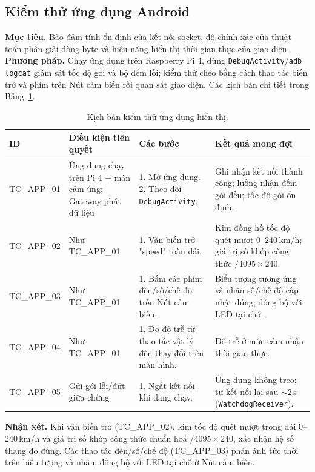 \documentclass[../DoAn.tex]{subfiles}
\begin{document}
\subsection{Kiểm thử ứng dụng Android}
\label{section:4.4.3}

\textbf{Mục tiêu.} Bảo đảm tính ổn định của kết nối socket, độ chính xác của
thuật toán phân giải dòng byte và hiệu năng hiển thị thời gian thực của giao
diện. \textbf{Phương pháp.} Chạy ứng dụng trên Raspberry Pi 4, dùng
\texttt{DebugActivity}/\texttt{adb logcat} giám sát tốc độ gói và bộ đếm lỗi;
kiểm thử chéo bằng cách thao tác biến trở và phím trên Nút cảm biến rồi quan sát
giao diện. Các kịch bản chi tiết trong Bảng~\ref{tab:tc-app}.

\begin{table}[H]
  \centering
  \caption{Kịch bản kiểm thử ứng dụng hiển thị.}
  \label{tab:tc-app}
  \begin{tabular}{@{}p{1.7cm}p{2.6cm}p{4.2cm}p{4.2cm}@{}}
    \toprule
    \textbf{ID} & \textbf{Điều kiện tiên quyết} & \textbf{Các bước} & \textbf{Kết quả mong đợi} \\
    \midrule
    TC\_APP\_01 & Ứng dụng chạy trên Pi 4 + màn cảm ứng; Gateway phát dữ liệu &
      1. Mở ứng dụng. 2. Theo dõi \texttt{DebugActivity}. & Ghi nhận kết nối
      thành công; luồng nhận đếm gói đều; tốc độ gói ổn định. %
      \\
    TC\_APP\_02 & Như TC\_APP\_01 & 1. Vặn biến trở "speed" toàn dải. & Kim đồng
      hồ tốc độ quét mượt 0--240\,km/h; giá trị số khớp công thức $/4095\times240$. \\
    TC\_APP\_03 & Như TC\_APP\_01 & 1. Bấm các phím đèn/số/chế độ trên Nút cảm
      biến. & Biểu tượng tương ứng và nhãn số/chế độ cập nhật đúng; đồng bộ với
      LED tại chỗ. \\
    TC\_APP\_04 & Như TC\_APP\_01 & 1. Đo độ trễ từ thao tác vật lý đến thay đổi
      trên màn hình. & Độ trễ ở mức cảm nhận thời gian thực. %
      \\
    TC\_APP\_05 & Gửi gói lỗi/đứt giữa chừng & 1. Ngắt kết nối khi đang chạy. &
      Ứng dụng không treo; tự kết nối lại sau $\sim$2\,s (\texttt{WatchdogReceiver}). \\
    \bottomrule
  \end{tabular}
\end{table}

\textbf{Nhận xét.} Khi vặn biến trở (TC\_APP\_02), kim tốc độ quét mượt trong
dải 0--240\,km/h và giá trị số khớp công thức chuẩn hoá $/4095\times240$, xác
nhận hệ số thang đo đúng. Các thao tác đèn/số/chế độ (TC\_APP\_03) phản ánh tức
thời trên biểu tượng và nhãn, đồng bộ với LED tại chỗ ở Nút cảm biến.
\end{document}
